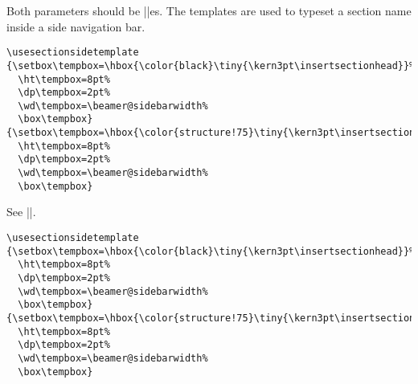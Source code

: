 \begin{command}{\usesectionsidetemplate{}}
  Both parameters should be |\hbox|es. The templates are used to
  typeset a section name inside a side navigation bar.
  \example
\begin{verbatim}
\usesectionsidetemplate
{\setbox\tempbox=\hbox{\color{black}\tiny{\kern3pt\insertsectionhead}}%
  \ht\tempbox=8pt%
  \dp\tempbox=2pt%
  \wd\tempbox=\beamer@sidebarwidth%
  \box\tempbox}
{\setbox\tempbox=\hbox{\color{structure!75}\tiny{\kern3pt\insertsectionhead}}%
  \ht\tempbox=8pt%
  \dp\tempbox=2pt%
  \wd\tempbox=\beamer@sidebarwidth%
  \box\tempbox}
\end{verbatim}
\end{command}



\begin{command}{\usesubsectionsidetemplate{}}
  See |\usesectionsidetemplate|.
  \example
\begin{verbatim}
\usesectionsidetemplate
{\setbox\tempbox=\hbox{\color{black}\tiny{\kern3pt\insertsectionhead}}%
  \ht\tempbox=8pt%
  \dp\tempbox=2pt%
  \wd\tempbox=\beamer@sidebarwidth%
  \box\tempbox}
{\setbox\tempbox=\hbox{\color{structure!75}\tiny{\kern3pt\insertsectionhead}}%
  \ht\tempbox=8pt%
  \dp\tempbox=2pt%
  \wd\tempbox=\beamer@sidebarwidth%
  \box\tempbox}
\end{verbatim}
\end{command}













